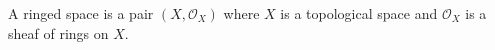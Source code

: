 \documentclass[12pt]{article}
\begin{document}
\begin{definition}
A ringed space is a pair $(X, \mathcal{O}_X)$ where $X$ is a topological space and $\mathcal{O}_X$ is a sheaf of rings on $X$.
\end{definition}
\end{document}
